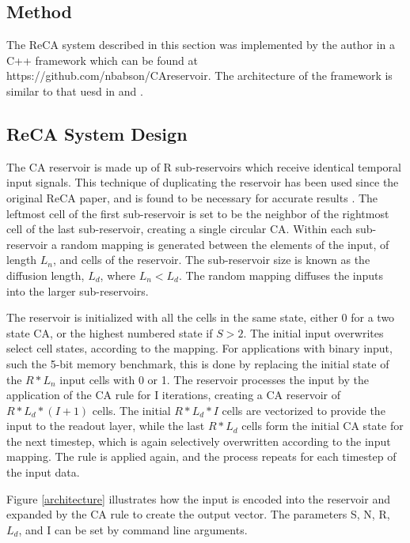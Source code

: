 \documentclass{article}
\begin{document}
\begin{multicols}{2}
\section{Method}\label{method}
The ReCA system described in this section was implemented by the author in a 
C++ framework which can be found at https://github.com/nbabson/CAreservoir. The 
architecture of the framework is similar to that uesd in  
\cite{nichele2017deep} and \cite{bye2016investigation}.

\subsection{ReCA System Design}
The CA reservoir is made up of R sub-reservoirs which receive identical 
temporal input signals. This technique of duplicating the reservoir has been 
used since the original ReCA paper, and is found to be necessary for accurate 
results \cite{yilmaz2014reservoir}.
The leftmost cell of the first sub-reservoir is set to be the 
neighbor of the rightmost cell of the last sub-reservoir, creating a single 
circular CA.  Within each sub-reservoir a random mapping is generated between 
the elements of the input, of length $L_{n}$, and cells of the reservoir. The 
sub-reservoir size is known as the diffusion length, $L_{d}$, where $L_{n} < 
L_{d}$. The random mapping diffuses the inputs into the larger sub-reservoirs.  
\par The reservoir is initialized with all the cells in the same state, either 
0 for a two state CA, or the highest numbered state if $S > 2$. The initial 
input overwrites select cell states, according to the mapping. For applications 
with binary input, such the 5-bit memory benchmark, this is done by replacing 
the initial state of the $R * L_{n}$ input cells with 0 or 1.  The reservoir 
processes the input by the application of the CA rule for I iterations, 
          creating a CA reservoir of $R * L_{d} * (I + 1)$ cells. The initial 
          $R * L_{d} * I$ cells are vectorized to provide the input to the 
          readout layer, while the last $R * L_{d}$ cells form the initial CA 
          state for the next timestep, which is again selectively overwritten 
          according to the input mapping. The rule is applied again, and the 
          process repeats for each timestep of the input data.  \par  Figure 
          \ref{architecture} illustrates how the input is encoded into the 
          reservoir and expanded by the CA rule to create the output vector.  
          The parameters S, N, R, $L_{d}$, and I can be set by command line 
          arguments.


\end{multicols}
\end{document}
